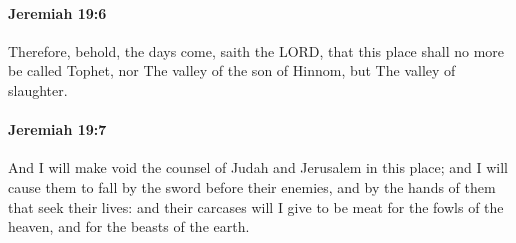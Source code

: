 		\paragraph{Jeremiah 19:6} %
			\label{JEREMIAH-19-6}

			Therefore, behold, the days come, saith the LORD, that this place shall no more be called Tophet, nor The valley of the son of Hinnom, but The valley of slaughter.


		\paragraph{Jeremiah 19:7} %
			\label{JEREMIAH-19-7}

			And I will make void the counsel of Judah and Jerusalem in this place; and I will cause them to fall by the sword before their enemies, and by the hands of them that seek their lives: and their carcases will I give to be meat for the fowls of the heaven, and for the beasts of the earth.

